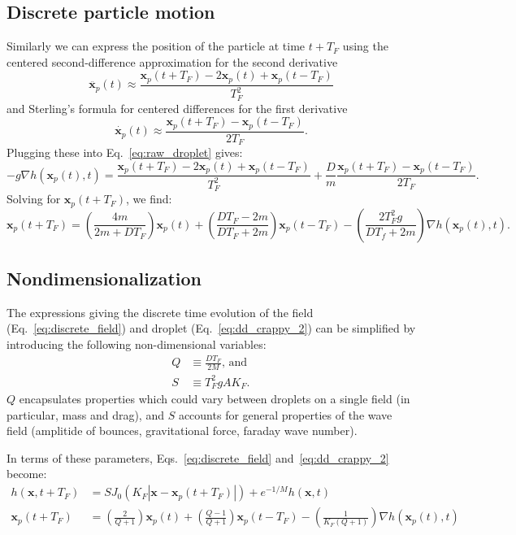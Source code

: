 \documentclass{article}
\newcommand{\x}{\mathbf{x}}
\begin{document}
\subsection{Discrete particle motion}
Similarly we can express the position of the particle at time $t + T_{F}$ using the centered second-difference approximation for the second derivative
\begin{equation}
	\ddot{\x_p}(t) \approx \frac{\x_p(t + T_F) - 2 \x_p(t) + \x_p(t - T_F)}{T_F^2}
\end{equation}
and Sterling's formula for centered differences for the first derivative
\begin{equation}
	\dot{\x_p}(t) \approx \frac{\x_p(t + T_F) - \x_p(t - T_F)}{2 T_F}.
\end{equation}
Plugging these into Eq.~\ref{eq:raw_droplet} gives:
\begin{equation}
	\label{eq:dd_crappy}
	-g \nabla h(\x_p(t),t) = \frac{\x_p(t + T_F) - 2 \x_p(t) + \x_p(t - T_F)}{T_F^2}
	 + \frac{D}{m} \frac{\x_p(t + T_F) - \x_p(t - T_F)}{2 T_F}.
\end{equation}
Solving for $\x_p(t + T_F)$, we find:
\begin{equation}
	\label{eq:dd_crappy_2}
	\x_p(t + T_F) = \left( \frac{4 m}{2 m + D T_F} \right) \x_p(t) + \left( \frac{D T_F - 2m}{D T_F + 2m} \right) \x_p(t - T_F) - \left( \frac{2 T_F^2 g}{D T_f + 2m} \right) \nabla h(\x_p(t),t).
\end{equation}

\subsection{Nondimensionalization}
The expressions giving the discrete time evolution of the field (Eq.~\ref{eq:discrete_field}) and droplet (Eq.~\ref{eq:dd_crappy_2}) can be simplified by introducing the following non-dimensional variables:
\begin{align}
	Q &\equiv \frac{D T_F}{2 M}\text{, and }\\
	S &\equiv T_F^2 g A K_{F}.
\end{align}
$Q$ encapsulates properties which could vary between droplets on a single field (in particular, mass and drag), and $S$ accounts for general properties of the wave field (amplitide of bounces, gravitational force, faraday wave number).

In terms of these parameters, Eqs.~\ref{eq:discrete_field} and~\ref{eq:dd_crappy_2} become:
\begin{align}
	h(\x,t+T_F) &= S J_0 \left( K_F \left| \x - \x_p(t + T_F) \right | \right) + e^{-1/M} h(\x,t) \label{eq:nondim_field} \\
	\x_p(t + T_F) &= \left( \frac{2}{Q+1} \right) \x_p(t) + \left( \frac{Q-1}{Q+1} \right) \x_p(t - T_F) - \left( \frac{1}{K_F(Q+1)} \right) \nabla h(\x_p(t),t) \label{eq:nondim_field}
\end{align}
\end{document}
